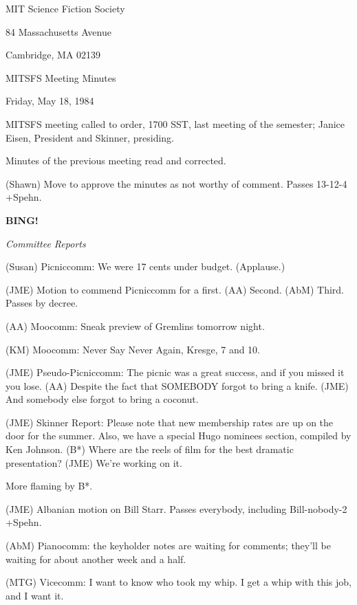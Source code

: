 \documentclass[12pt]{article}
\newcommand{\bing}{{\bf BING!} }
\newcommand{\goto}[1]{\bing \vskip 12pt \centerline{{\em{#1}}}}
\begin{document}
\begin{center}

MIT Science Fiction Society 

84 Massachusetts Avenue

Cambridge, MA 02139

\vspace{12pt}

MITSFS Meeting Minutes 

Friday, May 18, 1984

\end{center}
 
\vspace{18pt}

\setlength{\parskip}{6pt}

\noindent
MITSFS meeting called to order, 1700 SST, last meeting of the semester;
Janice Eisen, President and Skinner, presiding.

Minutes of the previous meeting read and corrected.

(Shawn) Move to approve the minutes as not worthy of comment. Passes 13-12-4 +Spehn.

\goto{Committee Reports}

(Susan) Picniccomm: We were 17 cents under budget. (Applause.)

(JME) Motion to commend Picniccomm for a first. (AA) Second. (AbM) Third. Passes by decree.

(AA) Moocomm: Sneak preview of Gremlins tomorrow night.

(KM) Moocomm: Never Say Never Again, Kresge, 7 and 10.

(JME) Pseudo-Picniccomm: The picnic was a great success, and if you missed it you lose. (AA) Despite the fact that SOMEBODY forgot to bring a knife. (JME) And somebody else forgot to bring a coconut.

(JME) Skinner Report: Please note that new membership rates are up on the door for the summer. Also, we have a special Hugo nominees section, compiled by Ken Johnson. (B*) Where are the reels of film for the best dramatic presentation? (JME) We're working on it.

More flaming by B*.

(JME) Albanian motion on Bill Starr. Passes everybody, including Bill-nobody-2 +Spehn.

(AbM) Pianocomm: the keyholder notes are waiting for comments; they'll be waiting for about another week and a half.

(MTG) Vicecomm: I want to know who took my whip. I get a whip with this job, and I want it.
\end{document}
